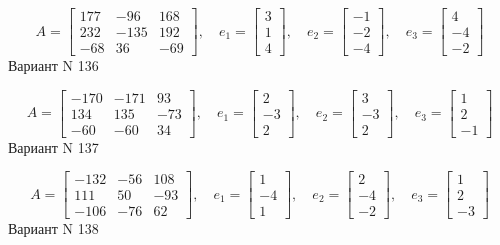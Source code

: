\documentclass[11pt]{report}
\begin{document}
$$A = \left[\begin{matrix}177 & -96 & 168\\232 & -135 & 192\\-68 & 36 & -69\end{matrix}\right],\quad e_1 = \left[\begin{matrix}3\\1\\4\end{matrix}\right],\quad e_2 = \left[\begin{matrix}-1\\-2\\-4\end{matrix}\right],\quad e_3 = \left[\begin{matrix}4\\-4\\-2\end{matrix}\right]$$Вариант N 136

$$A = \left[\begin{matrix}-170 & -171 & 93\\134 & 135 & -73\\-60 & -60 & 34\end{matrix}\right],\quad e_1 = \left[\begin{matrix}2\\-3\\2\end{matrix}\right],\quad e_2 = \left[\begin{matrix}3\\-3\\2\end{matrix}\right],\quad e_3 = \left[\begin{matrix}1\\2\\-1\end{matrix}\right]$$Вариант N 137

$$A = \left[\begin{matrix}-132 & -56 & 108\\111 & 50 & -93\\-106 & -76 & 62\end{matrix}\right],\quad e_1 = \left[\begin{matrix}1\\-4\\1\end{matrix}\right],\quad e_2 = \left[\begin{matrix}2\\-4\\-2\end{matrix}\right],\quad e_3 = \left[\begin{matrix}1\\2\\-3\end{matrix}\right]$$Вариант N 138
\end{document}

